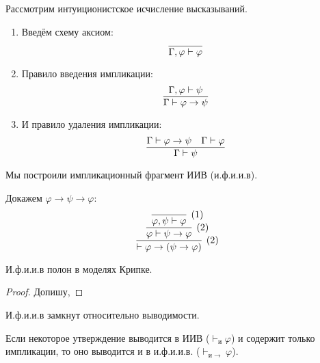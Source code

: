 \begin{definition}
    Рассмотрим интуиционистское исчисление высказываний.
    \begin{enumerate}
        \item Введём схему аксиом:
        \[
            \infer{\Gamma, \varphi \vdash \varphi}{}
        \]
        \item Правило введения импликации:
        \[
            \infer{\Gamma \vdash \varphi \rightarrow \psi}{\Gamma, \varphi \vdash \psi}
        \]
        \item И правило удаления импликации:
        \[
            \infer{\Gamma \vdash \psi}{\Gamma \vdash \varphi \rightarrow \psi & \Gamma \vdash \varphi}
        \]
    \end{enumerate}

    Мы построили импликационный фрагмент ИИВ (и.ф.и.и.в).
\end{definition}

\begin{example} Докажем $\varphi \rightarrow \psi \rightarrow \varphi$:
\[
    \infer[(2)]
        { \vdash \varphi \rightarrow (\psi \rightarrow \varphi) }
        { \infer[(2)]
            { \varphi \vdash \psi \rightarrow \varphi }
            { \infer[(1)]
                { \varphi, \psi \vdash \varphi}
                {}
            }
        }
\]
\end{example}

\begin{theorem}
    И.ф.и.и.в полон в моделях Крипке.
\end{theorem}

\begin{proof}
    Допишу, \todo %
\end{proof}

\begin{corollary}
    И.ф.и.и.в замкнут относительно выводимости.
\end{corollary}
Если некоторое утверждение выводится в ИИВ ($\vdash_{и} \varphi$) и содержит только импликации,
то оно выводится и в и.ф.и.и.в. ($\vdash_{и \rightarrow} \varphi$).
